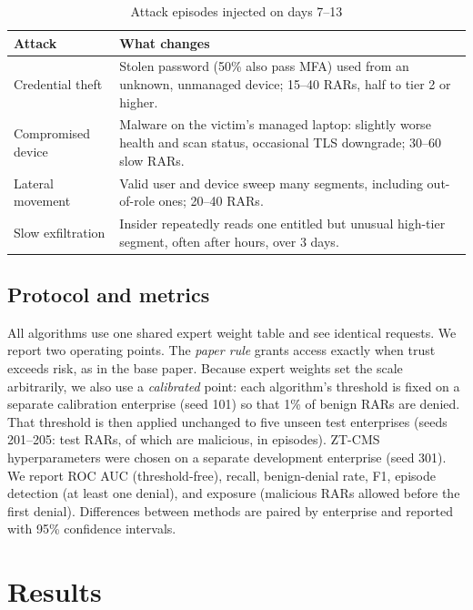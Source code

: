 \documentclass[conference,a4paper]{IEEEtran}
\begin{document}
\begin{table}[t]\caption{Attack episodes injected on days 7--13}\label{tab:attacks}
\centering\small\setlength{\tabcolsep}{3pt}
\begin{tabular}{p{}p{}}\toprule
Attack & What changes\\\midrule
Credential theft & Stolen password (50\% also pass MFA) used from an unknown, unmanaged device; 15--40 RARs, half to tier 2 or higher.\\
Compromised device & Malware on the victim's managed laptop: slightly worse health and scan status, occasional TLS downgrade; 30--60 slow RARs.\\
Lateral movement & Valid user and device sweep many segments, including out-of-role ones; 20--40 RARs.\\
Slow exfiltration & Insider repeatedly reads one entitled but unusual high-tier segment, often after hours, over 3 days.\\\bottomrule
\end{tabular}\end{table}

\subsection{Protocol and metrics}
All algorithms use one shared expert weight table and see identical requests. We report two operating points. The \emph{paper rule} grants access exactly when trust exceeds risk, as in the base paper. Because expert weights set the scale arbitrarily, we also use a \emph{calibrated} point: each algorithm's threshold is fixed on a separate calibration enterprise (seed 101) so that 1\% of benign RARs are denied. That threshold is then applied unchanged to five unseen test enterprises (seeds 201--205: \NTest{} test RARs, of which \NMal{} are malicious, in \NEp{} episodes). ZT-CMS hyperparameters were chosen on a separate development enterprise (seed 301). We report ROC AUC (threshold-free), recall, benign-denial rate, F1, episode detection (at least one denial), and exposure (malicious RARs allowed before the first denial). Differences between methods are paired by enterprise and reported with 95\% confidence intervals.



\section{Results}
\end{document}
